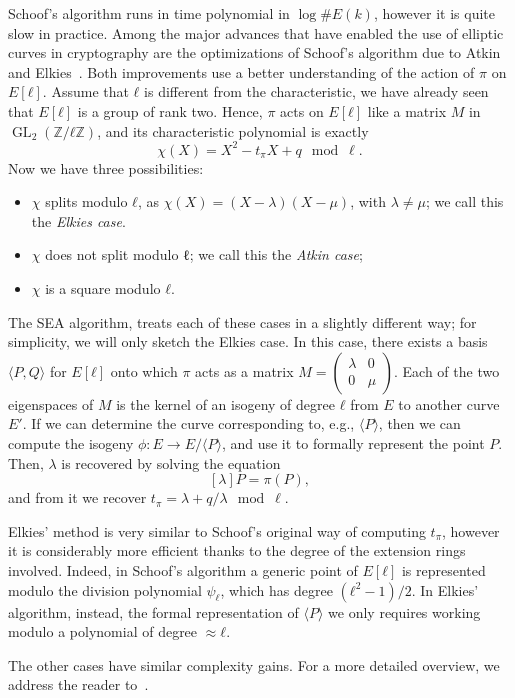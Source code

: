 \documentclass[10pt]{article}
\theoremstyle{plain}
\theoremstyle{definition}
\DeclareMathOperator{\GL}{GL}
\begin{document}
Schoof's algorithm runs in time polynomial in $\log\#E(k)$, however it
is quite slow in practice. %
Among the major advances that have enabled the use of elliptic curves
in cryptography are the optimizations of Schoof's algorithm due to
Atkin and Elkies~\cite{schoof95}. %
Both improvements use a better understanding of the action of $π$ on
$E[ℓ]$. %
Assume that $ℓ$ is different from the characteristic, we have already
seen that $E[ℓ]$ is a group of rank two. %
Hence, $π$ acts on $E[ℓ]$ like a matrix $M$ in $\GL_2(ℤ/ℓℤ)$, and its
characteristic polynomial is exactly
\[χ(X) = X^2 - t_πX + q \mod \ell.\] %
Now we have three possibilities:
\begin{itemize}
\item $χ$ splits modulo $ℓ$, as $χ(X) = (X-λ)(X-μ)$, with $λ≠μ$; we call
  this the \emph{Elkies case}.
\item $χ$ does not split modulo ℓ; we call this the \emph{Atkin case};
\item $χ$ is a square modulo $ℓ$.
\end{itemize}

The SEA algorithm, treats each of these cases in a slightly different
way; for simplicity, we will only sketch the Elkies case. %
In this case, there exists a basis $〈P,Q〉$ for $E[ℓ]$ onto which $π$
acts as a matrix
$M=\left(\begin{smallmatrix}λ&0\\0&μ\end{smallmatrix}\right)$. %
Each of the two eigenspaces of $M$ is the kernel of an isogeny of
degree $ℓ$ from $E$ to another curve $E'$. %
If we can determine the curve corresponding to, e.g., $〈P〉$, then we
can compute the isogeny $ϕ:E\to E/〈P〉$, and use it to formally
represent the point $P$. %
Then, $λ$ is recovered by solving the equation
\[[λ]P = π(P),\]
and from it we recover $t_π = λ + q/λ \mod \ell$.

Elkies' method is very similar to Schoof's original way of computing
$t_π$, however it is considerably more efficient thanks to the degree
of the extension rings involved. %
Indeed, in Schoof's algorithm a generic point of $E[ℓ]$ is represented
modulo the division polynomial $ψ_ℓ$, which has degree $(ℓ^2-1)/2$. %
In Elkies' algorithm, instead, the formal representation of $〈P〉$ we
only requires working modulo a polynomial of degree $≈ℓ$.

The other cases have similar complexity gains. %
For a more detailed overview, we address the reader
to~\cite{schoof95,lercier-algorithmique,elkies98,sutherland10}.
\end{document}
